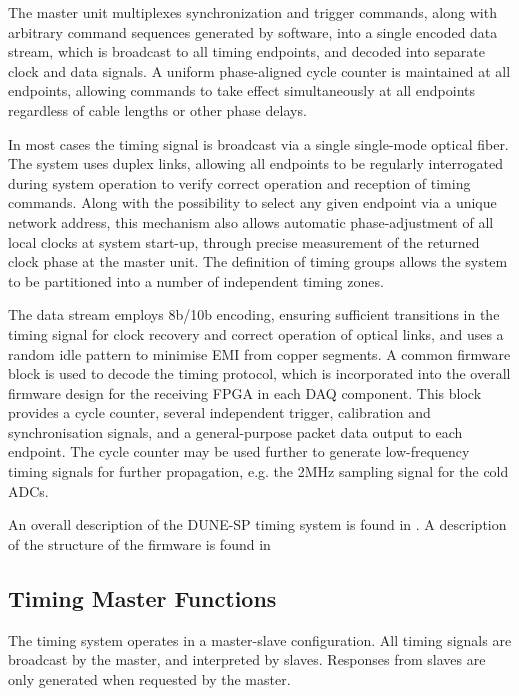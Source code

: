 \documentclass[a4paper,11pt]{article}
\begin{document}
The master unit multiplexes
synchronization and trigger commands, along with arbitrary command
sequences generated by software, into a single encoded data stream,
which is broadcast to all timing endpoints, and decoded into separate clock
and data signals. A uniform phase-aligned cycle counter is maintained at all endpoints,
allowing commands to take effect simultaneously at all endpoints
regardless of cable lengths or other phase delays.

In most cases the timing signal is broadcast via a single single-mode optical fiber. The system uses duplex links, allowing all endpoints
to be regularly interrogated during system operation to verify correct operation
and reception of timing commands. Along with the possibility to select
any given endpoint via a unique network address, this mechanism also allows
automatic phase-adjustment of all local clocks at system start-up,
through precise measurement of the returned clock phase at the master unit. The definition
of timing groups allows the system to be partitioned into a number of
independent timing zones.


The data stream employs 8b/10b encoding, ensuring sufficient transitions in the
timing signal for clock recovery and correct operation of optical links, and uses a random idle 
pattern to minimise EMI from copper segments. A common firmware block is used to
decode the timing protocol, which is incorporated into the overall
firmware design for the receiving FPGA in each DAQ component. This
block provides a cycle counter, several independent trigger, calibration and 
synchronisation signals, and a general-purpose packet data output to each endpoint.
The cycle counter may be used further to generate low-frequency timing signals for
further propagation, e.g. the 2MHz sampling signal for the cold ADCs.

An overall description of the DUNE-SP timing system is found in \cite{ref:dts-sp-description}. A description of the structure of the firmware is found in \cite{ref:dts-sp-firmware}


\subsection{Timing Master Functions}

The timing system operates in a master-slave configuration. All timing signals are broadcast by the master, and interpreted by slaves. Responses from slaves are only generated when requested by the master.
\end{document}
